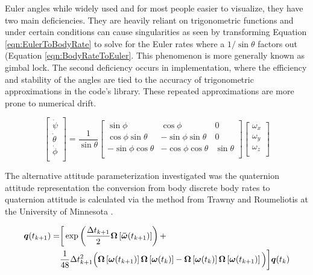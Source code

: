 Euler angles while widely used and for most people easier to visualize, they have two main deficiencies.  They are heavily reliant on trigonometric functions and under certain conditions can cause singularities as seen by transforming Equation \ref{eqn:EulerToBodyRate} to solve for the Euler rates where a $1/\sin \theta$ factors out (Equation \ref{eqn:BodyRateToEuler}.  This phenomenon is more generally known as gimbal lock.  The second deficiency occurs in implementation, where the efficiency and stability of the angles are tied to the accuracy of trigonometric approximations in the code's library.  These repeated approximations are more prone to numerical drift.

\begin{equation}
  \begin{bmatrix}
    \dot{\psi} \\
    \dot{\theta} \\
    \dot{\phi} \\
  \end{bmatrix}
  =
  \frac{1}{\sin \theta}
  \begin{bmatrix}
    \sin \phi & \cos \phi & 0 \\
    \cos \phi \sin \theta & -\sin \phi \sin \theta & 0 \\
    -\sin \phi \cos \theta & -\cos \phi \cos \theta & \sin \theta \\
  \end{bmatrix}
  \begin{bmatrix}
    \omega_x \\
    \omega_y \\
    \omega_z \\
  \end{bmatrix}
  \label{eqn:BodyRateToEuler}
\end{equation}

The alternative attitude parameterization investigated was the quaternion attitude representation the conversion from body discrete body rates to quaternion attitude is calculated via the method from Trawny and Roumeliotis at the University of Minnesota \cite{marslab}.

\begin{equation}
  \begin{aligned}
    \boldsymbol{q}(t_{k+1}) = & \bigg[ \exp \left( \frac{\Delta t_{k+1}}{2} \boldsymbol{\Omega} \left[ \boldsymbol{\bar{\omega}}(t_{k+1}) \right] \right) + \\
    & \frac{1}{48} \Delta t_{k+1}^2 \Big(
    \boldsymbol{\Omega} \left[\boldsymbol{\omega}(t_{k+1}) \right]
    \boldsymbol{\Omega} \left[\boldsymbol{\omega}(t_{k})   \right] -
    \boldsymbol{\Omega} \left[\boldsymbol{\omega}(t_{k})   \right]
    \boldsymbol{\Omega} \left[\boldsymbol{\omega}(t_{k+1}) \right]
      \Big) \bigg] \boldsymbol{q}(t_{k})
  \end{aligned}
  \label{eqn:DiscreteQuaternionPropagation}
\end{equation}

